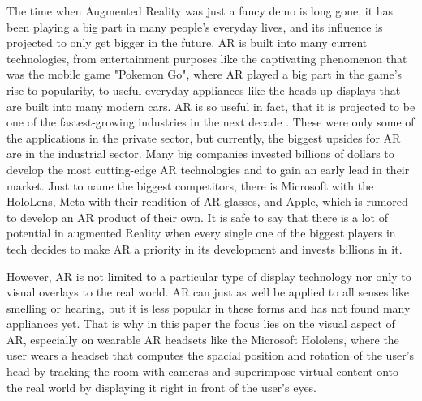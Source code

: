The time when Augmented Reality was just a fancy demo is long gone, it has been playing a big part in many people's everyday lives, and its influence is projected to only get bigger in the future. AR is built into many current technologies, from entertainment purposes like the captivating phenomenon that was the mobile game "Pokemon Go", where AR played a big part in the game’s rise to popularity, to useful everyday appliances like the heads-up displays that are built into many modern cars. AR is so useful in fact, that it is projected to be one of the fastest-growing industries in the next decade \cite{XR_Projection}. These were only some of the applications in the private sector, but currently, the biggest upsides for AR are in the industrial sector. Many big companies invested billions of dollars to develop the most cutting-edge AR technologies and to gain an early lead in their market. Just to name the biggest competitors, there is Microsoft with the HoloLens, Meta with their rendition of AR glasses, and Apple, which is rumored to develop an AR product of their own. It is safe to say that there is a lot of potential in augmented Reality when every single one of the biggest players in tech decides to make AR a priority in its development and invests billions in it. 

However, AR is not limited to a particular type of display technology nor only to visual overlays to the real world. AR can just as well be applied to all senses like smelling or hearing, but it is less popular in these forms and has not found many appliances yet. That is why in this paper the focus lies on the visual aspect of AR, especially on wearable AR headsets like the Microsoft Hololens, where the user wears a headset that computes the spacial position and rotation of the user's head by tracking the room with cameras and superimpose virtual content onto the real world by displaying it right in front of the user's eyes.

